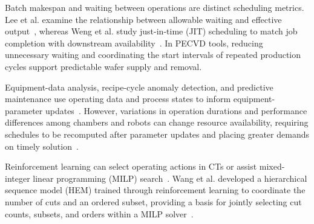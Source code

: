 \documentclass[final,5p,times,twocolumn]{elsarticle}
\begin{document}
Batch makespan and waiting between operations are distinct scheduling metrics. Lee et al. examine the relationship between allowable waiting and effective output~\citep{lee2018waiting}, whereas Weng et al. study just-in-time (JIT) scheduling to match job completion with downstream availability~\citep{weng2022jit}. In PECVD tools, reducing unnecessary waiting and coordinating the start intervals of repeated production cycles support predictable wafer supply and removal.

Equipment-data analysis, recipe-cycle anomaly detection, and predictive maintenance use operating data and process states to inform equipment-parameter updates~\citep{sun2024manufacturing,chen2020anomaly,biebl2020maintenance}. However, variations in operation durations and performance differences among chambers and robots can change resource availability, requiring schedules to be recomputed after parameter updates and placing greater demands on timely solution~\citep{rahmani2014robust}.

Reinforcement learning can select operating actions in CTs or assist mixed-integer linear programming (MILP) search~\citep{kim2025adaptivecluster,tang2020cut,huang2022cutranking,paulus2022looking}. Wang et al. developed a hierarchical sequence model (HEM) trained through reinforcement learning to coordinate the number of cuts and an ordered subset, providing a basis for jointly selecting cut counts, subsets, and orders within a MILP solver~\citep{wang2023hem}.
\end{document}
